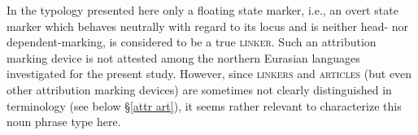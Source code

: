 In the typology presented here only a floating state marker, i.e., an overt state marker which behaves neutrally with regard to its locus and is neither head- nor dependent\hyp{}marking, is considered to be a true \textsc{linker}. Such an attribution marking device is not attested among the northern Eurasian languages investigated for the present study. However, since \textsc{linkers} and \textsc{articles} (but even other attribution marking devices) are sometimes not clearly distinguished in terminology (see below \S\ref{attr art}), it seems rather relevant to characterize this noun phrase type here.

